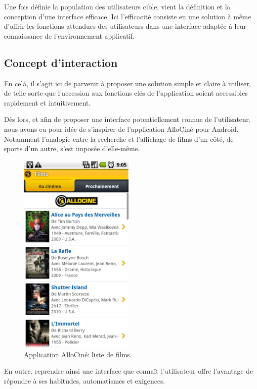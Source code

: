 \documentclass{article}
\begin{document}
	Une fois définie la population des utilisateurs cible, vient la définition et
	la conception d'une interface efficace.
	Ici l'efficacité consiste en une solution à même d'offrir les fonctions
	attendues des utilisateurs dans une interface adaptée à leur connaissance de
	l'environnement applicatif.

	\subsection{Concept d'interaction}

	En celà, il s'agit ici de parvenir à proposer une solution simple et claire à
	utiliser, de telle sorte que l'accession aux fonctions clés de l'application
	soient accessibles rapidement et intuitivement.

	Dès lors, et afin de proposer une interface potentiellement connue de
	l'utilisateur, nous avons eu pour idée de s'inspirer de l'application AlloCiné
	pour Android.
	Notamment l'analogie entre la recherche et l'affichage de films d'un côté, de
	sports d'un autre, s'est imposée d'elle-même.

	\begin{figure}[ht]
		\centering
		\includegraphics[width=0.5\textwidth]{allocine.png}
		\caption{Application AlloCiné: liste de films.}
		\label{fig:allocine}
	\end{figure}

	En outre, reprendre ainsi une interface que connaît l'utilisateur offre
	l'avantage de répondre à ses habitudes, automatismes et exigences.
\end{document}
